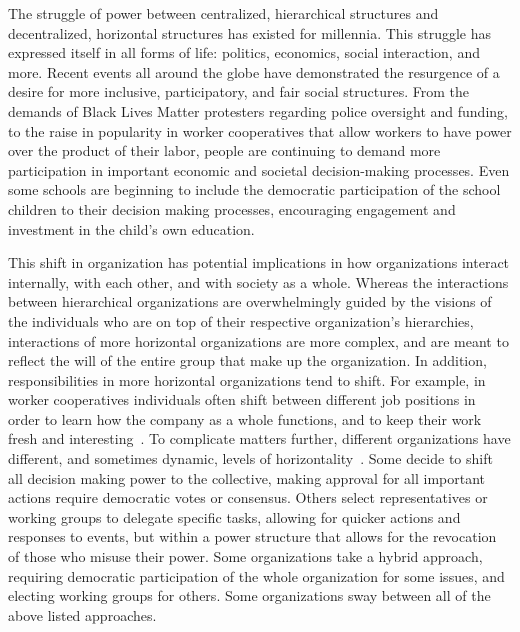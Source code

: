 The struggle of power between centralized, hierarchical structures and
decentralized, horizontal structures has existed for millennia. This struggle has
expressed itself in all forms of life: politics, economics, social interaction,
and more. Recent events all around the globe have demonstrated the resurgence of
a desire for more inclusive, participatory, and fair social structures. From the
demands of Black Lives Matter protesters regarding police oversight and funding,
to the raise in popularity in worker cooperatives that allow workers to have
power over the product of their labor, people are continuing to demand more
participation in important economic and societal decision-making processes. %
Even some schools are beginning to include the democratic participation of the
school children to their decision making processes, encouraging engagement and
investment in the child's own education.~\cite{pacheco2008escola}

This shift in organization has potential implications in how organizations
interact internally, with each other, and with society as a whole. Whereas the
interactions between hierarchical organizations are overwhelmingly guided by
the visions of the individuals who are on top of their respective organization's
hierarchies, interactions of more horizontal organizations are more complex, and
are meant to reflect the will of the entire group that make up the organization.
In addition, responsibilities in more horizontal organizations tend to shift.
For example, in worker cooperatives individuals often shift between different
job positions in order to learn how the company as a whole functions, and to
keep their work fresh and 
interesting~\cite{jackall19846, wright2014worker, lindenfeld1982workplace}.
To complicate matters further, different organizations have different, and
sometimes dynamic, levels of  horizontality~\cite{wright2014worker}. Some decide
to shift all decision making power to the collective, making approval for all
important actions require democratic votes or consensus. Others select
representatives or working groups to delegate specific tasks, allowing for
quicker actions and responses to events, but within a power structure that
allows for the revocation of those who misuse their power. Some organizations
take a hybrid approach, requiring democratic participation of the whole
organization for some issues, and electing working groups for others. Some
organizations sway between all of the above listed approaches.

